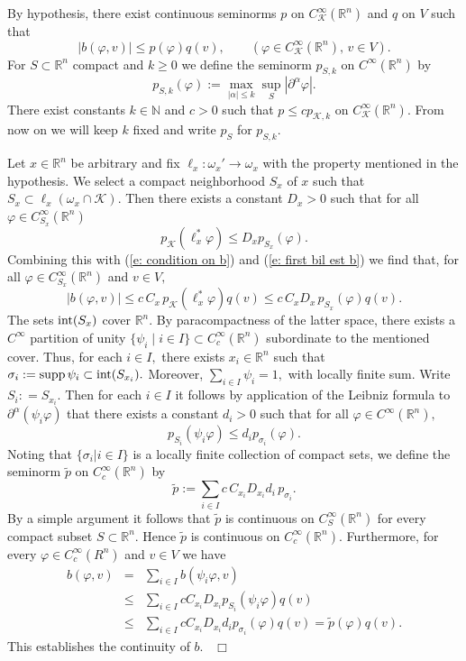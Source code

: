 \documentclass[12pt,a4paper]{article}
\def\proof{\par\noindent{\it Proof.}{\ }{\ }}
\def\qed{~\hfill\hbox{$\Box$}\medbreak}
\def\qquad{\quad\quad}
\def\msy#1{{\mathbb #1}}
\def\N{{\msy N}}
\def\R{{\msy R}}
\def\ga{\alpha}
\def\gf{\varphi}
\def\gs{\sigma}
\def\to{\rightarrow}
\def\cK{{\mathcal K}}
\numberwithin{Thm}{section}
\numberwithin{equation}{section}
\def\supp{{\rm supp}}
\numberwithin{equation}{section}
\begin{document}
\proof
By hypothesis,
there exist continuous seminorms $p$ on $C_{\cK}^\infty(\R^n)$ and $q $ on $V$ such that
\begin{equation}
\label{e: first bil est b}
|b(\gf, v)| \leq p(\gf) q(v), \qquad (\gf \in C_{\cK}^\infty(\R^n), \,v \in V). 
\end{equation}
For $S \subset \R^n$ compact and $k \geq 0$ we define the seminorm $p_{S, k}$ on $C^\infty(\R^n)$ by 
$$
p_{S, k}(\gf) := \max_{|\ga|\leq k} \sup_S |\partial^\ga \gf|.
$$ 
There exist constants $k \in \N$ and $c> 0$ such that $p \leq c p_{\cK, k}$ 
on $C^\infty_{\cK}(\R^n).$ From now on we will keep $k$ fixed and write
$p_{S}$ for $p_{S, k}.$ 

Let $x \in \R^n$ be arbitrary and fix $\ell_x: \omega_x' \to \omega_x$ with the property
mentioned in the hypothesis. We select a compact neighborhood $S_x$ of $x$ 
such that $S_x \subset \ell_x(\omega_x\cap \cK).$  Then there exists a constant $D_x > 0$ such that
for all $\gf \in C^\infty_{S_x}(\R^n)$ 
$$ 
p_\cK(\ell^*_x\gf) \leq D_x p_{S_x}(\gf).
$$ 
Combining this with (\ref{e: condition on b}) and (\ref{e: first bil est b}) we find that, for all $\gf \in C^\infty_{S_x}(\R^n)$ and $v \in V,$ 
$$ 
|b(\gf, v)| \leq  c \,C_x \, p_\cK (\ell_x^*\gf) q(v) \leq c \,C_x D_x \,p_{S_x}(\gf) q(v).
$$
The sets ${\rm int}(S_x)$ cover $\R^n.$ By paracompactness of the latter space,
there exists a $C^\infty$ partition of unity $\{\psi_i\mid i \in I\} \subset C^\infty_c(\R^n)$ subordinate to the mentioned cover.
Thus, for each $i \in I,$ there exists $x_i \in \R^n$ such that $\gs_i:= \supp \,\psi_i \subset {\rm int} (S_{x_i}).$
Moreover, $\sum_{i\in I} \psi_i = 1,$ with locally finite sum. Write $S_i: = S_{x_i}.$ Then 
for each $i \in I$ it follows
by application of the Leibniz formula to $\partial^\ga(\psi_i \gf)$ that 
there exists
a constant $d_i > 0$ such that for all $\gf \in C^\infty(\R^n),$ 
$$ 
p_{S_i}(\psi_i \gf) \leq d_i p_{\gs_i}(\gf). 
$$ 
Noting that $\{\gs_i| i\in I\}$ is a locally finite collection of compact sets, we 
define the seminorm $\tilde p$ on $C_c^\infty (\R^n)$ by 
$$
\tilde p:= \sum_{i\in I}  c \,C_{x_i}D_{x_i} d_i \, p_{\gs_i}. 
$$ 
By a simple argument it follows that $\tilde p$ is continuous on $C^\infty_S(\R^n)$ 
for every compact subset $S \subset \R^n.$ Hence $\tilde p$ is continuous on $C_c^\infty(\R^n).$ 
Furthermore, for every $\gf \in C^\infty_c(R^n)$ and $v \in V$ 
we have
\begin{eqnarray*}
b(\gf, v) & = & \sum_{i\in I} b(\psi_i\gf, v) \\
& \leq &  \sum_{i\in I} c C_{x_i} D_{x_i} 
p_{S_i}(\psi_i \gf) q(v)\\
& \leq & \sum_{i \in I} c C_{x_i} D_{x_i} d_i p_{\gs_i}(\gf) q(v)
= \tilde p(\gf) q(v).
\end{eqnarray*}
This establishes the continuity of $b.$ 
\qed
\end{document}
